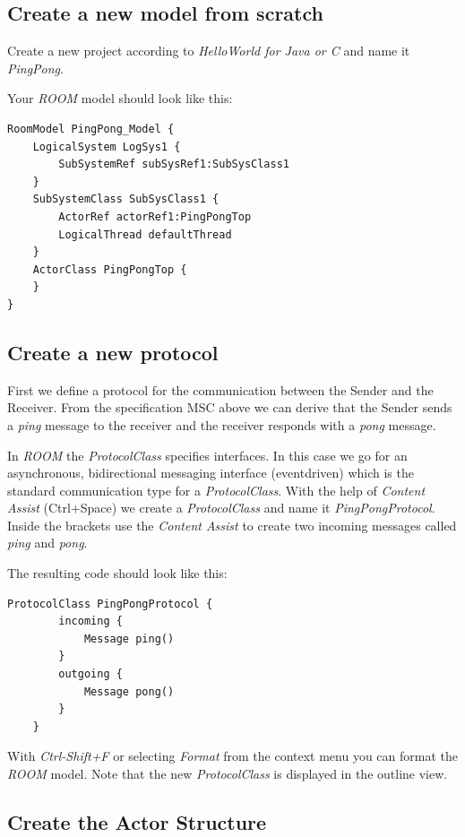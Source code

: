 \subsection{Create a new model from scratch}

Create a new \eTrice{} project according to \textit{HelloWorld for Java or C} and name it \textit{PingPong}.

Your \emph{ROOM} model should look like this:

\begin{lstlisting}[language=ROOM]
RoomModel PingPong_Model {
	LogicalSystem LogSys1 {
		SubSystemRef subSysRef1:SubSysClass1 
	}
	SubSystemClass SubSysClass1 {
		ActorRef actorRef1:PingPongTop 
		LogicalThread defaultThread
	}
	ActorClass PingPongTop {
	}
}
\end{lstlisting}

\subsection{Create a new protocol}

First we define a protocol for the communication between the Sender and the Receiver. From the specification MSC above we can derive that the Sender sends a \emph{ping} message to the receiver and the receiver responds with a \emph{pong} message. 

In \emph{ROOM} the \emph{ProtocolClass} specifies interfaces. In this case we go for an asynchronous, bidirectional messaging interface (eventdriven) which is the standard communication type for a \emph{ProtocolClass}.
With the help of \textit{Content Assist} (Ctrl+Space) we create a \textit{ProtocolClass} and name it 
\textit{PingPongProtocol}.
Inside the brackets use the \textit{Content Assist}  to create two incoming messages called 
\textit{ping} and \textit{pong}.

The resulting code should look like this:

\begin{lstlisting}[language=ROOM]
	ProtocolClass PingPongProtocol {
		incoming {
			Message ping()
		}
		outgoing {
			Message pong()
		}
	} 
\end{lstlisting}

With \emph{Ctrl-Shift+F} or selecting \textit{Format} from the context menu you can format the \emph{ROOM} model. Note that 
the new \textit{ProtocolClass} is displayed in the outline view.

\subsection{Create the Actor Structure}
